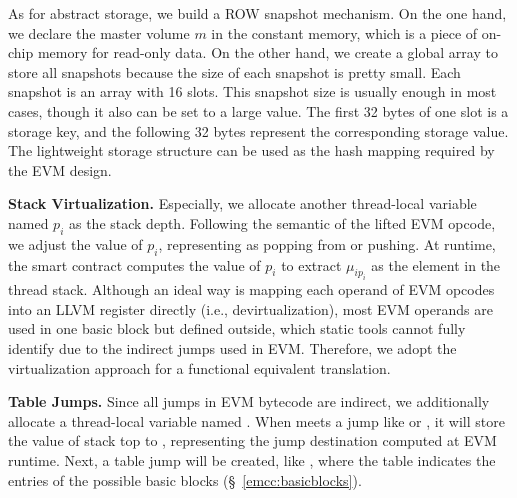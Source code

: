 As for abstract storage, we build a ROW snapshot mechanism.
On the one hand, we declare the master volume $m$ in the constant memory, which is a piece of on-chip memory for read-only data.
On the other hand, we create a global array to store all snapshots because the size of each snapshot is pretty small. 
Each snapshot is an array with 16 slots. 
This snapshot size is usually enough in most cases, though it also can be set to a large value.
%
The first 32 bytes of one slot is a storage key, and the following 32 bytes represent the corresponding storage value. 
The lightweight storage structure can be used as the hash mapping required by the EVM design.

\noindent\textbf{Stack Virtualization.}
Especially, we allocate another thread-local variable named $p_i$ as the stack depth. 
Following the semantic of the lifted EVM opcode, we adjust the value of $p_i$, representing as popping from or pushing. 
At runtime, the smart contract computes the value of $p_i$ to extract $\mu_{ip_i}$ as the element in the thread stack. 
%
Although an ideal way is mapping each operand of EVM opcodes into an LLVM register directly (i.e., devirtualization\cite{devir2017llvm}), most EVM operands are used in one basic block but defined outside, which static tools cannot fully identify due to the indirect jumps used in EVM. 
Therefore, we adopt the virtualization approach for a functional equivalent translation.

\noindent\textbf{Table Jumps.}
Since all jumps in EVM bytecode are indirect, we additionally allocate a thread-local variable named . 
When {\translator} meets a jump like  or , it will store the value of stack top to , representing the jump destination computed at EVM runtime. 
Next, a table jump will be created, like , where the table indicates the entries of the possible basic blocks (\S~\ref{emcc:basicblocks}).




